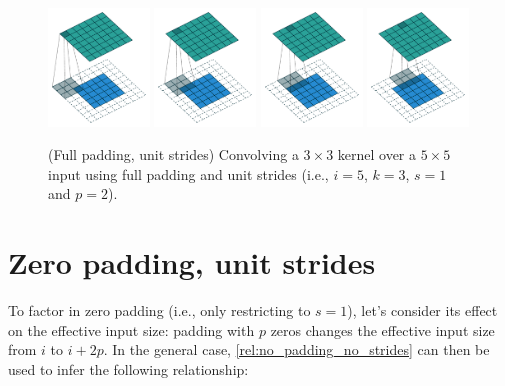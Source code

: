 \begin{figure}[p]
    \centering
    \includegraphics[width=0.24\textwidth]{pdf/full_padding_no_strides_00.pdf}
    \includegraphics[width=0.24\textwidth]{pdf/full_padding_no_strides_01.pdf}
    \includegraphics[width=0.24\textwidth]{pdf/full_padding_no_strides_02.pdf}
    \includegraphics[width=0.24\textwidth]{pdf/full_padding_no_strides_03.pdf}
    \caption{\label{fig:full_padding_no_strides} (Full padding, unit strides)
        Convolving a $3 \times 3$ kernel over a $5 \times 5$ input using full
        padding and unit strides (i.e., $i = 5$, $k = 3$, $s = 1$ and $p = 2$).}
\end{figure}

\section{Zero padding, unit strides}

To factor in zero padding (i.e., only restricting to $s = 1$), let's consider
its effect on the effective input size: padding with $p$ zeros changes the
effective input size from $i$ to $i + 2p$. In the general case,
\autoref{rel:no_padding_no_strides} can then be used to infer the following
relationship:

